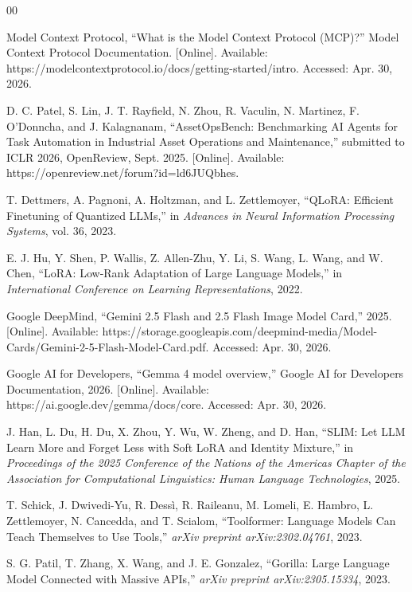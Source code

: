 \documentclass[conference]{IEEEtran}
\begin{document}
\begin{thebibliography}{00}

 Model Context Protocol, ``What is the Model Context Protocol (MCP)?'' Model Context Protocol Documentation. [Online]. Available: https://modelcontextprotocol.io/docs/getting-started/intro. Accessed: Apr. 30, 2026.

 D. C. Patel, S. Lin, J. T. Rayfield, N. Zhou, R. Vaculin, N. Martinez, F. O'Donncha, and J. Kalagnanam, ``AssetOpsBench: Benchmarking AI Agents for Task Automation in Industrial Asset Operations and Maintenance,'' submitted to ICLR 2026, OpenReview, Sept. 2025. [Online]. Available: https://openreview.net/forum?id=ld6JUQbhes.

 T. Dettmers, A. Pagnoni, A. Holtzman, and L. Zettlemoyer, ``QLoRA: Efficient Finetuning of Quantized LLMs,'' in \textit{Advances in Neural Information Processing Systems}, vol. 36, 2023.

 E. J. Hu, Y. Shen, P. Wallis, Z. Allen-Zhu, Y. Li, S. Wang, L. Wang, and W. Chen, ``LoRA: Low-Rank Adaptation of Large Language Models,'' in \textit{International Conference on Learning Representations}, 2022.

 Google DeepMind, ``Gemini 2.5 Flash and 2.5 Flash Image Model Card,'' 2025. [Online]. Available: https://storage.googleapis.com/deepmind-media/Model-Cards/Gemini-2-5-Flash-Model-Card.pdf. Accessed: Apr. 30, 2026.

 Google AI for Developers, ``Gemma 4 model overview,'' Google AI for Developers Documentation, 2026. [Online]. Available: https://ai.google.dev/gemma/docs/core. Accessed: Apr. 30, 2026.

 J. Han, L. Du, H. Du, X. Zhou, Y. Wu, W. Zheng, and D. Han, ``SLIM: Let LLM Learn More and Forget Less with Soft LoRA and Identity Mixture,'' in \textit{Proceedings of the 2025 Conference of the Nations of the Americas Chapter of the Association for Computational Linguistics: Human Language Technologies}, 2025.

 T. Schick, J. Dwivedi-Yu, R. Dess\`i, R. Raileanu, M. Lomeli, E. Hambro, L. Zettlemoyer, N. Cancedda, and T. Scialom, ``Toolformer: Language Models Can Teach Themselves to Use Tools,'' \textit{arXiv preprint arXiv:2302.04761}, 2023.

 S. G. Patil, T. Zhang, X. Wang, and J. E. Gonzalez, ``Gorilla: Large Language Model Connected with Massive APIs,'' \textit{arXiv preprint arXiv:2305.15334}, 2023.


\end{thebibliography}
\end{document}
